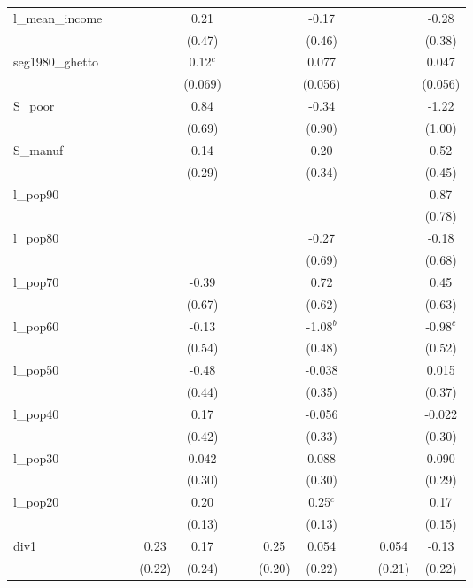 \documentclass[]{article}
\begin{document}
\begin{tabular}{lcccccccccccc}
l\_mean\_income &  &  &  & 0.21 &  &  &  & -0.17 &  &  &  & -0.28 \\
 &  &  &  & (0.47) &  &  &  & (0.46) &  &  &  & (0.38) \\
seg1980\_ghetto &  &  &  & 0.12$^c$ &  &  &  & 0.077 &  &  &  & 0.047 \\
 &  &  &  & (0.069) &  &  &  & (0.056) &  &  &  & (0.056) \\
S\_poor &  &  &  & 0.84 &  &  &  & -0.34 &  &  &  & -1.22 \\
 &  &  &  & (0.69) &  &  &  & (0.90) &  &  &  & (1.00) \\
S\_manuf &  &  &  & 0.14 &  &  &  & 0.20 &  &  &  & 0.52 \\
 &  &  &  & (0.29) &  &  &  & (0.34) &  &  &  & (0.45) \\
l\_pop90 &  &  &  &  &  &  &  &  &  &  &  & 0.87 \\
 &  &  &  &  &  &  &  &  &  &  &  & (0.78) \\
l\_pop80 &  &  &  &  &  &  &  & -0.27 &  &  &  & -0.18 \\
 &  &  &  &  &  &  &  & (0.69) &  &  &  & (0.68) \\
l\_pop70 &  &  &  & -0.39 &  &  &  & 0.72 &  &  &  & 0.45 \\
 &  &  &  & (0.67) &  &  &  & (0.62) &  &  &  & (0.63) \\
l\_pop60 &  &  &  & -0.13 &  &  &  & -1.08$^b$ &  &  &  & -0.98$^c$ \\
 &  &  &  & (0.54) &  &  &  & (0.48) &  &  &  & (0.52) \\
l\_pop50 &  &  &  & -0.48 &  &  &  & -0.038 &  &  &  & 0.015 \\
 &  &  &  & (0.44) &  &  &  & (0.35) &  &  &  & (0.37) \\
l\_pop40 &  &  &  & 0.17 &  &  &  & -0.056 &  &  &  & -0.022 \\
 &  &  &  & (0.42) &  &  &  & (0.33) &  &  &  & (0.30) \\
l\_pop30 &  &  &  & 0.042 &  &  &  & 0.088 &  &  &  & 0.090 \\
 &  &  &  & (0.30) &  &  &  & (0.30) &  &  &  & (0.29) \\
l\_pop20 &  &  &  & 0.20 &  &  &  & 0.25$^c$ &  &  &  & 0.17 \\
 &  &  &  & (0.13) &  &  &  & (0.13) &  &  &  & (0.15) \\
div1 &  &  & 0.23 & 0.17 &  &  & 0.25 & 0.054 &  &  & 0.054 & -0.13 \\
 &  &  & (0.22) & (0.24) &  &  & (0.20) & (0.22) &  &  & (0.21) & (0.22) \\

\end{tabular}
\end{document}
